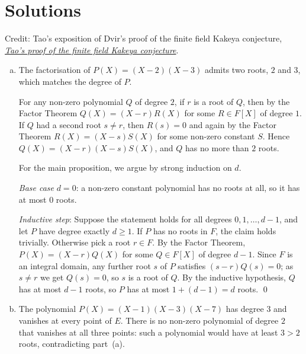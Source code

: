\documentclass[12pt]{article}
\begin{document}
\newpage
\section*{Solutions}

Credit: Tao's exposition of Dvir's proof of the finite field Kakeya conjecture,
\href{https://terrytao.wordpress.com/2008/03/24/dvirs-proof-of-the-finite-field-kakeya-conjecture/}{\textit{Tao's proof of the finite field Kakeya conjecture}}.

\begin{enumerate}[(a)]

  \item

  The factorisation of $P(X) = (X - 2)(X - 3)$ admits two roots, $2$
  and $3$, which matches the degree of $P$.

  For any non-zero polynomial $Q$ of degree $2$, if $r$ is a root of
  $Q$, then by the Factor Theorem $Q(X) = (X - r)R(X)$ for some
  $R \in F[X]$ of degree $1$.  If $Q$ had a second root $s \neq r$,
  then $R(s) = 0$ and again by the Factor Theorem
  $R(X) = (X - s)S(X)$ for some non-zero constant $S$.
  Hence $Q(X) = (X - r)(X - s)S(X)$, and $Q$ has no more than $2$ roots.

  For the main proposition, we argue by strong induction on $d$.

  \textit{Base case} $d = 0$: a non-zero constant polynomial has no
  roots at all, so it has at most $0$ roots. \checkmark

  \textit{Inductive step}: Suppose the statement holds for all degrees
  $0, 1, \ldots, d-1$, and let $P$ have degree exactly $d \ge 1$.
  If $P$ has no roots in $F$, the claim holds trivially.
  Otherwise pick a root $r \in F$.
  By the Factor Theorem, $P(X) = (X - r)Q(X)$ for some
  $Q \in F[X]$ of degree $d - 1$.
  Since $F$ is an integral domain, any further root $s$ of $P$ satisfies
  $(s - r)Q(s) = 0$; as $s \neq r$ we get $Q(s) = 0$, so $s$ is a
  root of $Q$.
  By the inductive hypothesis, $Q$ has at most $d - 1$ roots, so $P$
  has at most $1 + (d-1) = d$ roots. \qed

  \item

  The polynomial $P(X) = (X-1)(X-3)(X-7)$ has degree $3$ and vanishes
  at every point of $E$.  There is no non-zero polynomial of degree $2$
  that vanishes at all three points: such a polynomial would have at
  least $3 > 2$ roots, contradicting part~(a).


\end{enumerate}
\end{document}
